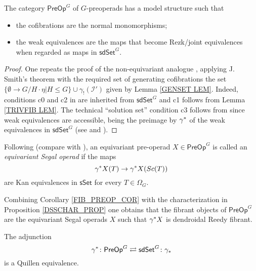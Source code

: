 \documentclass[a4paper,10pt
 ,draft
]{article}%
\begin{document}
\begin{theorem}\label{PREOPMOD THM}
	The category $\mathsf{PreOp}^G$ of $G$-preoperads has a model structure such that
	\begin{itemize}
		\item the cofibrations are the normal monomorphisms;
		\item the weak equivalences are the maps 
		that become Rezk/joint equivalences when regarded as maps in 
		$\mathsf{sdSet}^G$.
	\end{itemize}
\end{theorem}

\begin{proof}
One repeats the proof of the non-equivariant analogue \cite[Thm. 8.13]{CM13a}, applying J. Smith's theorem \cite[Thm. 1.7]{Bek00} with the required set of generating cofibrations the 
set $\{\emptyset \to G/H\cdot \eta | H \leq G\} \cup \gamma_! (\mathcal{I}')$ given by Lemma \ref{GENSET LEM}.
Indeed, conditions c0 and c2 in \cite{Bek00} are inherited from 
$\mathsf{sdSet}^G$ and c1 follows from Lemma \ref{TRIVFIB LEM}.
The technical ``solution set'' condition c3 follows from 
\cite[Prop. 1.15]{Bek00} since weak equivalences are accessible, being the preimage by $\gamma^{\**}$ of the weak equivalences in 
$\mathsf{sdSet}^G$ 
(see \cite[Cor. A.2.6.5]{Lur09} and \cite[Cor. A.2.6.6]{Lur09}). 
\end{proof}


\begin{definition}
	Following \cite[Def. 5.5]{CM13b} (compare with \cite[Def. 8.1]{CM13a}), an equivariant pre-operad $X \in \mathsf{PreOp}^G$ is called an \textit{equivariant Segal operad} if the maps
	\[
	\gamma^{\**} X (T) \to \gamma^{\**} X (Sc(T))
	\]
are Kan equivalences in $\mathsf{sSet}$ for every $T \in \Omega_G$.
\end{definition}

\begin{remark}
Combining Corollary \ref{FIB_PREOP_COR} with the characterization in Proposition \ref{DSSCHAR_PROP}
one obtains that the fibrant objects of $\mathsf{PreOp}^G$ are the equivariant Segal operads $X$ such that
$\gamma^{\**} X$ is dendroidal Reedy fibrant.
\end{remark}

\begin{theorem}\label{ANOQUEQUIV THM}
The adjunction
\[
	\gamma^{\**} \colon \mathsf{PreOp}^G	
\rightleftarrows
	\mathsf{sdSet}^G \colon \gamma_{\**}
\]
is a Quillen equivalence.
\end{theorem}
\end{document}
